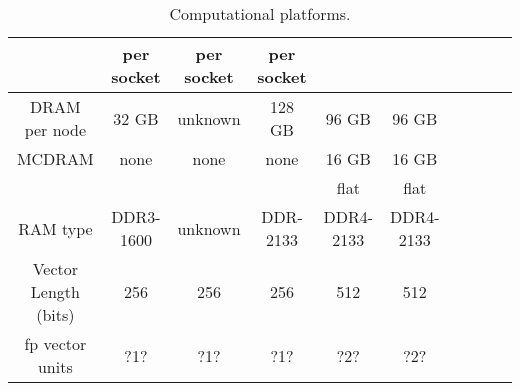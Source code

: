 \begin{table}
\begin{center}
\begin{tabular}{|c|c|c|c|c|c|c|c|c|c|}
                           & per socket  & per socket & per socket   &                  &                \\ \hline
DRAM per node              & 32 GB       & unknown    & 128 GB       &  96 GB           & 96 GB          \\ \hline
MCDRAM                     & none        & none       & none         &  16 GB           & 16 GB       \\
                           &             &            &              &  flat            & flat        \\ \hline
RAM type                   & DDR3-1600   & unknown    & DDR-2133     & DDR4-2133        & DDR4-2133       \\ \hline
Vector Length (bits)       & 256         & 256        & 256          & 512              & 512              \\ \hline
fp vector units            & ?1?         & ?1?        & ?1?          & ?2?              & ?2?             \\ \hline 
\hline
\end{tabular}
\caption{Computational platforms\label{tbl:platforms}.}
\end{center}
\end{table}
